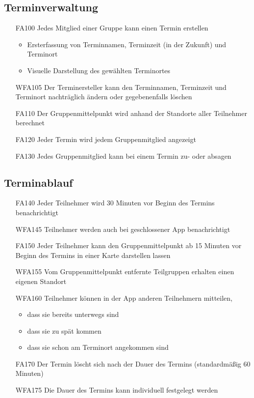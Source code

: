\documentclass{scrartcl}
\begin{document}
	\subsection{Terminverwaltung}
	\begin{itemize}
		\item[FA100] Jedes \gls{Mitglied} einer Gruppe kann einen Termin erstellen
		
		\begin{itemize}
			\item Ersterfassung von Terminnamen, Terminzeit (in der Zukunft) und Terminort
		\end{itemize}
		
		\begin{itemize}
			\item Visuelle Darstellung des gewählten Terminortes
		\end{itemize}
		\item[WFA105] Der Terminersteller kann den Terminnamen, Terminzeit und Terminort nachträglich ändern oder gegebenenfalls löschen
		\item[FA110] Der Gruppenmittelpunkt wird anhand der Standorte aller Teilnehmer berechnet		
		\item[FA120] Jeder Termin wird jedem Gruppenmitglied angezeigt
		\item[FA130] Jedes Gruppenmitglied kann bei einem Termin zu- oder absagen
		
	\end{itemize}
	
	\subsection{Terminablauf}
	\begin{itemize}
		\item[FA140] Jeder \gls{Teilnehmer} wird 30 Minuten vor Beginn des Termins benachrichtigt
		\item[WFA145] \gls{Teilnehmer} werden auch bei geschlossener App benachrichtigt
		\item[FA150] Jeder \gls{Teilnehmer} kann den Gruppenmittelpunkt ab 15 Minuten vor Beginn des Termins in einer Karte darstellen lassen
		\item[WFA155] Vom Gruppenmittelpunkt entfernte Teilgruppen  erhalten einen eigenen Standort 
		\item[WFA160] \gls{Teilnehmer} können in der App anderen Teilnehmern mitteilen,
		\begin{itemize}
			\item dass sie bereits unterwegs sind
			\item dass sie zu spät kommen
			\item dass sie schon am Terminort angekommen sind
		\end{itemize}
		\item[FA170] Der Termin löscht sich nach der Dauer des Termins (standardmäßig 60 Minuten)
		\item[WFA175] Die Dauer des Termins kann individuell festgelegt werden
	\end{itemize}
		
\end{document}
